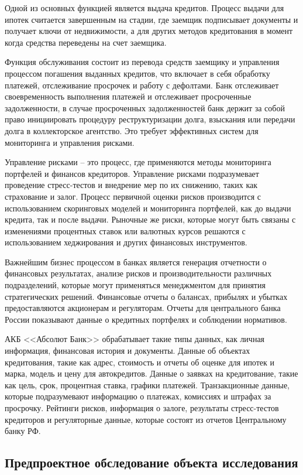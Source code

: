 \documentclass[14pt, a4paper]{extarticle}
\begin{document}
Одной из основных функцией является выдача кредитов. Процесс выдачи для ипотек
считается завершенным на стадии, где заемщик подписывает документы и получает
ключи от недвижимости, а для других методов кредитования в момент когда
средства переведены на счет заемщика.

Функция обслуживания состоит из перевода средств
заемщику и управления процессом погашения выданных кредитов, что включает в
себя обработку платежей, отслеживание просрочек и работу с дефолтами. Банк
отслеживает своевременность выполнения платежей и отслеживает просроченные
задолженности, в случае просроченных задолженностей банк держит за собой право
инициировать процедуру реструктуризации долга, взыскания или передачи долга в
коллекторское агентство. Это требует эффективных систем для мониторинга и
управления рисками.

Управление рисками -- это процесс, где применяются методы
мониторинга портфелей и финансов кредиторов. Управление рисками подразумевает
проведение стресс-тестов и внедрение мер по их снижению, таких как страхование
и залог. Процесс первичной оценки рисков производится с использованием
скоринговых моделей и мониторинга портфелей, как до выдачи кредита, так и после
выдачи. Рыночные же риски, которые могут быть связаны с изменениями процентных
ставок или валютных курсов решаются с использованием хеджирования и других
финансовых инструментов.

Важнейшим бизнес процессом в банках является генерация отчетности о финансовых
результатах, анализе рисков и производительности различных подразделений,
которые могут применяться менеджментом для принятия стратегических решений.
Финансовые отчеты о балансах, прибылях и убытках предоставляются акционерам и
регуляторам. Отчеты для центрального банка России показывают данные о кредитных
портфелях и соблюдении нормативов.

АКБ <<Абсолют Банк>> обрабатывает такие типы данных, как личная информация,
финансовая история и документы. Данные об объектах кредитования, такие как
адрес, стоимость и отчеты об оценке для ипотек и марка, модель и цену для
автокредитов. Данные о заявках на кредитование, такие как цель, срок,
процентная ставка, графики платежей. Транзакционные данные, которые
подразумевают информацию о платежах, комиссиях и штрафах за просрочку. Рейтинги
рисков, информация о залоге, результаты стресс-тестов кредиторов и регуляторные
данные, которые состоят из отчетов Центральному банку РФ.

\subsection{Предпроектное обследование объекта исследования}
\end{document}
